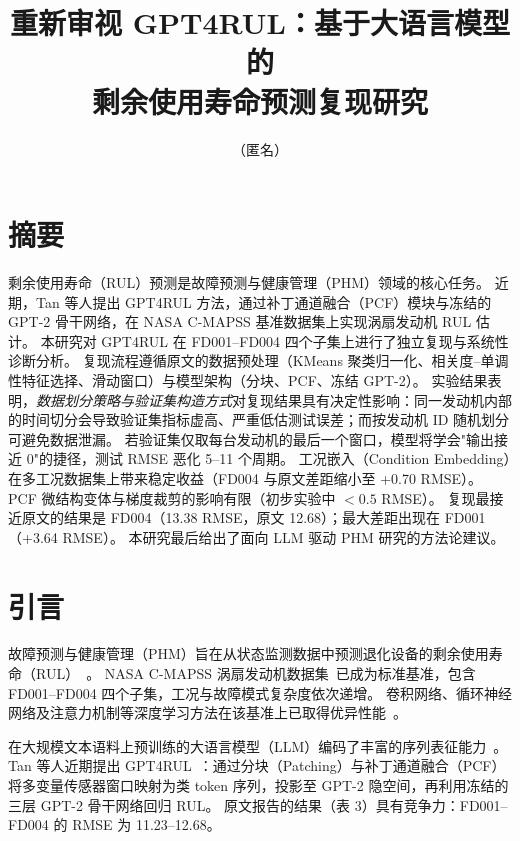 \documentclass[UTF8,a4paper,10pt,twocolumn]{ctexart}
\title{\textbf{重新审视 GPT4RUL：基于大语言模型的\\剩余使用寿命预测复现研究}}
\author{（匿名）}
\date{}
\begin{document}
\maketitle

\section*{摘要}

剩余使用寿命（RUL）预测是故障预测与健康管理（PHM）领域的核心任务。
近期，Tan 等人提出 GPT4RUL 方法，通过补丁通道融合（PCF）模块与冻结的 GPT-2 骨干网络，在 NASA C-MAPSS 基准数据集上实现涡扇发动机 RUL 估计。
本研究对 GPT4RUL 在 FD001--FD004 四个子集上进行了独立复现与系统性诊断分析。
复现流程遵循原文的数据预处理（KMeans 聚类归一化、相关度--单调性特征选择、滑动窗口）与模型架构（分块、PCF、冻结 GPT-2）。
实验结果表明，\emph{数据划分策略与验证集构造方式}对复现结果具有决定性影响：同一发动机内部的时间切分会导致验证集指标虚高、严重低估测试误差；而按发动机 ID 随机划分可避免数据泄漏。
若验证集仅取每台发动机的最后一个窗口，模型将学会"输出接近 0"的捷径，测试 RMSE 恶化 5--11 个周期。
工况嵌入（Condition Embedding）在多工况数据集上带来稳定收益（FD004 与原文差距缩小至 +0.70 RMSE）。
PCF 微结构变体与梯度裁剪的影响有限（初步实验中 $<0.5$ RMSE）。
复现最接近原文的结果是 FD004（13.38 RMSE，原文 12.68）；最大差距出现在 FD001（+3.64 RMSE）。
本研究最后给出了面向 LLM 驱动 PHM 研究的方法论建议。

\section{引言}

故障预测与健康管理（PHM）旨在从状态监测数据中预测退化设备的剩余使用寿命（RUL）~\cite{saxena2008}。
NASA C-MAPSS 涡扇发动机数据集~\cite{saxena2008}已成为标准基准，包含 FD001--FD004 四个子集，工况与故障模式复杂度依次递增。
卷积网络、循环神经网络及注意力机制等深度学习方法在该基准上已取得优异性能~\cite{li2020,ellefsen2019}。

在大规模文本语料上预训练的大语言模型（LLM）编码了丰富的序列表征能力~\cite{radford2019}。
Tan 等人近期提出 GPT4RUL~\cite{tan2025}：通过分块（Patching）与补丁通道融合（PCF）将多变量传感器窗口映射为类 token 序列，投影至 GPT-2 隐空间，再利用冻结的三层 GPT-2 骨干网络回归 RUL。
原文报告的结果（表 3）具有竞争力：FD001--FD004 的 RMSE 为 11.23--12.68。
\end{document}
